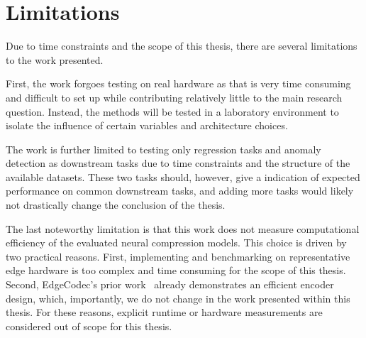\section{Limitations}
Due to time constraints and the scope of this thesis, there are several limitations to the work presented. 

First, the work forgoes testing on real hardware as that is very time consuming and difficult to set up while contributing relatively little to the main research question. Instead, the methods will be tested in a laboratory environment to isolate the influence of certain variables and architecture choices. 

The work is further limited to testing only regression tasks and anomaly detection as downstream tasks due to time constraints and the structure of the available datasets. These two tasks should, however, give a indication of expected performance on common downstream tasks, and adding more tasks would likely not drastically change the conclusion of the thesis. 

The last noteworthy limitation is that this work does not measure computational efficiency of the evaluated neural compression models. This choice is driven by two practical reasons. First, implementing and benchmarking on representative edge hardware is too complex and time consuming for the scope of this thesis. Second, EdgeCodec's prior work~\cite{Hodo2025} already demonstrates an efficient encoder design, which, importantly, we do not change in the work presented within this thesis. For these reasons, explicit runtime or hardware measurements are considered out of scope for this thesis.





